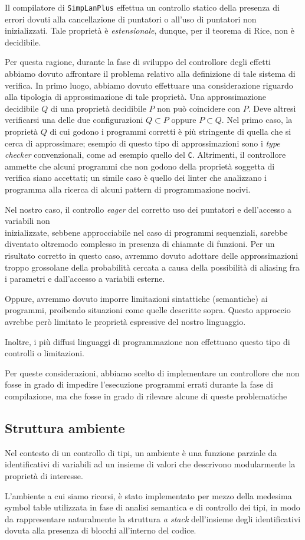 \documentclass[../../main]{subfiles}
\begin{document}
Il compilatore di \texttt{SimpLanPlus} effettua un controllo statico della presenza di errori dovuti alla cancellazione di puntatori o all'uso di puntatori non inizializzati. Tale proprietà è \emph{estensionale}, dunque, per il teorema di Rice, non è decidibile. 

Per questa ragione, durante la fase di sviluppo del controllore degli effetti abbiamo dovuto affrontare il problema relativo alla definizione di tale sistema di verifica. In primo luogo, abbiamo dovuto effettuare una considerazione riguardo alla tipologia di approssimazione di tale proprietà. Una approssimazione decidibile $Q$ di una proprietà decidibile $P$ non può coincidere con $P$. Deve altresì verificarsi una delle due configurazioni $Q\subset P$ oppure $P \subset Q$. Nel primo caso, la proprietà $Q$ di cui godono i programmi corretti è più stringente di quella che si cerca di approssimare; esempio di questo tipo di approssimazioni sono i \emph{type checker} convenzionali, come ad esempio quello del \texttt{C}. Altrimenti, il controllore ammette che alcuni programmi che non godono della proprietà soggetta di verifica siano accettati; un simile caso è quello dei linter che analizzano i programma alla ricerca di alcuni pattern di programmazione nocivi.

Nel nostro caso, il controllo \emph{eager} del corretto uso dei puntatori e dell'accesso a variabili non \\ inizializzate, sebbene approcciabile nel caso di programmi sequenziali, sarebbe diventato oltremodo complesso in presenza di chiamate di funzioni. Per un risultato corretto in questo caso, avremmo dovuto adottare delle approssimazioni troppo grossolane della probabilità cercata a causa della possibilità di aliasing fra i parametri e dall'accesso a variabili esterne.

Oppure, avremmo dovuto imporre limitazioni sintattiche (semantiche) ai programmi, proibendo situazioni come quelle descritte sopra. Questo approccio avrebbe però limitato le proprietà espressive del nostro linguaggio.

Inoltre, i più diffusi linguaggi di programmazione non effettuano questo tipo di controlli o limitazioni.

Per queste considerazioni, abbiamo scelto di implementare un controllore che non fosse in grado di impedire l'esecuzione programmi errati durante la fase di compilazione, ma che fosse in grado di rilevare alcune di queste problematiche 

\subsection{Struttura ambiente}

Nel contesto di un controllo di tipi, un ambiente è una funzione parziale da identificativi di variabili ad un insieme di valori che descrivono modularmente la proprietà di interesse.

L'ambiente a cui siamo ricorsi, è stato implementato per mezzo della medesima symbol table utilizzata in fase di analisi semantica e di controllo dei tipi, in modo da rappresentare naturalmente la struttura \emph{a stack} dell'insieme degli identificativi dovuta alla presenza di blocchi all'interno del codice. 
\end{document}
